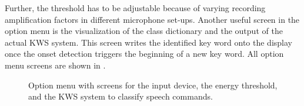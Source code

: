 Further, the threshold has to be adjustable because of varying recording amplification factors in different microphone set-ups.
Another useful screen in the option menu is the visualization of the class dictionary and the output of the actual KWS system.
This screen writes the identified key word onto the display once the onset detection triggers the beginning of a new key word.
All option menu screens are shown in .
\begin{figure}[!ht]
  \centering
  \qquad
  \qquad
  \caption{Option menu with screens for the input device, the energy threshold, and the KWS system to classify speech commands.}
  \label{fig:game_design_menu_options}
\end{figure}
\FloatBarrier
\noindent



